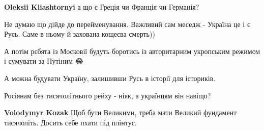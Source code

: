 \begin{itemize}
\begin{itemize}
 
\textbf{Oleksii Kliashtornyi} а що є Греція чи Франція чи Германія?
\end{itemize}

 
Не думаю що дійде до перейменування. Важливий сам меседж - Україна це і є Русь. Саме в ньому й захована кощеєва смерть))

 
А потім рєбята із Московії будуть боротись із авторитарним укропським режимом і сумувати за Путіним 😂

 

А можна будувати Україну, залишивши Русь в історії для істориків.

Росіянам без тисячолітнього рейху - ніяк, а українцям він навіщо?

\begin{itemize}
 
\textbf{Volodymyr Kozak} Щоб бути Великими, треба мати Великий фундамент тисячоліть. Досить себе пхати під плінтус.

 

\end{itemize}
\end{itemize}
